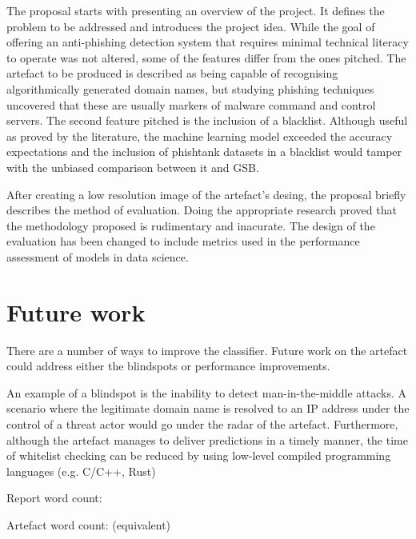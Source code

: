 The proposal starts with presenting an overview of the project. It defines the problem to be addressed and introduces the project idea. While the goal of offering an anti-phishing detection system that requires minimal technical literacy to operate was not altered, some of the features differ from the ones pitched. The artefact to be produced is described as being capable of recognising algorithmically generated domain names, but studying phishing techniques uncovered that these are usually markers of malware command and control servers. The second feature pitched is the inclusion of a blacklist. Although useful as proved by the literature, the machine learning model exceeded the accuracy expectations and the inclusion of phishtank datasets in a blacklist would tamper with the unbiased comparison between it and GSB.

After creating a low resolution image of the artefact's desing, the proposal briefly describes the method of evaluation. Doing the appropriate research proved that the methodology proposed is rudimentary and inacurate. The design of the evaluation has been changed to include metrics used in the performance assessment of models in data science.

\section{Future work}
There are a number of ways to improve the classifier. Future work on the artefact could address either the blindspots or performance improvements.

An example of a blindspot is the inability to detect man-in-the-middle attacks. A scenario where the legitimate domain name is resolved to an IP address under the control of a threat actor would go under the radar of the artefact. Furthermore, although the artefact manages to deliver predictions in a timely manner, the time of whitelist checking can be reduced by using low-level compiled programming languages (e.g. C/C++, Rust)

% 

\clearpage
\vspace*{\fill}
\begin{center}
\begin{minipage}{.6\textwidth}
\centering 
Report word count:

Artefact word count: (equivalent)
\end{minipage}
\end{center}
\vfill
\clearpage


